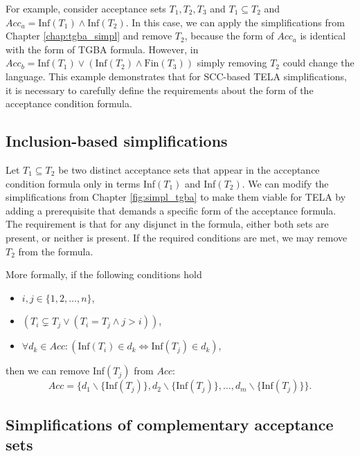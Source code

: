 \documentclass[
  digital, %
  twoside, %
  table,   %
  lof,     %
  lot,     %
]{fithesis3}
\begin{document}
For example, consider acceptance sets $T_1, T_2, T_3$ and $T_1 \subseteq T_2$ and $Acc_a = \text{Inf}(T_1) \wedge \text{Inf}(T_2)$. In this case, we can apply the simplifications from Chapter \ref{chap:tgba_simpl} and remove $T_2$, because the form of $Acc_a$ is identical with the form of TGBA formula. However, in $Acc_b = \text{Inf}(T_1) \vee (\text{Inf}(T_2) \wedge \text{Fin}(T_3))$ simply removing $T_2$ could change the language. This example demonstrates that for SCC-based TELA simplifications, it is necessary to carefully define the requirements about the form of the acceptance condition formula.

\subsection{Inclusion-based simplifications}
Let $T_1 \subseteq T_2$ be two distinct acceptance sets that appear in the acceptance condition formula only in terms Inf$(T_1)$ and Inf$(T_2)$. We can modify the simplifications from Chapter \ref{fig:simpl_tgba} to make them viable for TELA by adding a prerequisite that demands a specific form of the acceptance formula. The requirement is that for any disjunct in the formula, either both sets are present, or neither is present. If the required conditions are met, we may remove $T_2$ from the formula. 

More formally, if the following conditions hold
\begin{itemize}
  \item $i, j \in \{1, 2, \dots, n\}$,
  \item $(T_i \subsetneq T_j \vee (T_i = T_j \wedge j > i))$,
  \item $\forall d_k \in Acc \colon (\text{Inf}(T_i) \in d_k \Leftrightarrow \text{Inf}(T_j) \in d_k)$,
\end{itemize}
then we can remove Inf$(T_j)$ from $Acc$: 
\begin{equation*}
  Acc = \{d_1 \smallsetminus \{\text{Inf}(T_j)\}, d_2 \smallsetminus \{\text{Inf}(T_j)\}, \dots, d_m \smallsetminus \{\text{Inf}(T_j)\}\}.
\end{equation*} 


\subsection{Simplifications of complementary acceptance sets}
\end{document}
